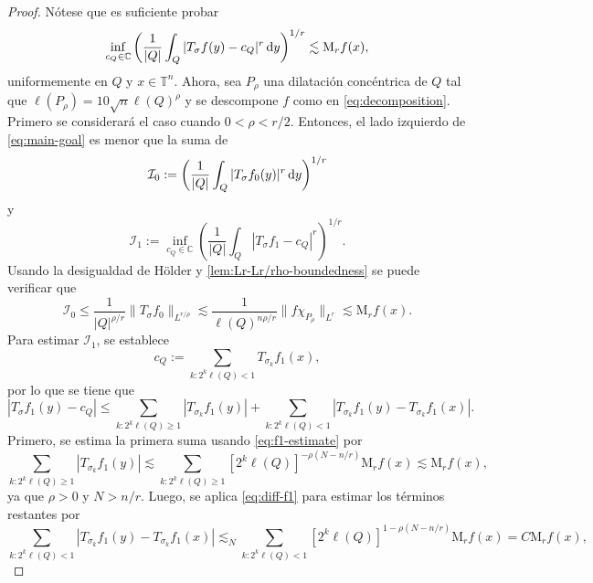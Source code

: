 \begin{proof}
Nótese que es suficiente probar 
\begin{equation}
	\inf_{c_Q\in \mathbb{C}} \left( 
	\frac{1}{|Q|} \int_Q|T_\sigma f(y) - c_Q|^r\mathop{}\!\mathrm{d} y
	\right)^{1/r} \lesssim \mathrm{M}_rf(x) ,
	\label{eq:main-goal}
\end{equation}
uniformemente en $Q$ y $x\in \mathbb{T}^n$. Ahora, sea $P_\rho$ una dilatación concéntrica de $Q$ tal que $\ell(P_\rho) = 10\sqrt{n}\ell(Q)^\rho$ y se descompone $f$ como en \cref{eq:decomposition}. Primero se considerará el caso cuando $0<\rho < r/2$. Entonces, el lado izquierdo de \cref{eq:main-goal} es menor que la suma de 
\begin{equation*}
	\mathcal{I}_0 := \left( 
	\frac{1}{|Q|} \int_Q|T_\sigma f_0(y)|^r\mathop{}\!\mathrm{d} y
	\right)^{1/r}
\end{equation*}
y 
\begin{equation*}
	\mathcal{I}_1 := \inf_{c_Q \in \mathbb{C}} \left(  \frac{1}{|Q|}\int_Q|T_\sigma f_1 - c_Q|^r
	\right)^{1/r}.
\end{equation*}
Usando la desigualdad de H\"older y \cref{lem:Lr-Lr/rho-boundedness} se puede verificar que 
\begin{equation*}
	\mathcal{I}_0 \leq \frac{1}{|Q|^{\rho/r}} \|T_\sigma f_0\|_{L^{r/\rho}} \lesssim\frac{1}{\ell(Q)^{n\rho/r}} \|f\chi_{P_\rho}\|_{L^r} \lesssim\mathrm{M}_rf(x). 
\end{equation*}
Para estimar $\mathcal{I}_1$, se establece 
\begin{equation}
	c_Q := \sum_{k:2^k\ell(Q)<1} T_{\sigma_k} f_1(x), 
	\label{eq:cQ}
\end{equation}
por lo que se tiene que
\begin{equation*}
	|T_\sigma f_1(y) - c_Q| \leq \sum_{k:2^k\ell(Q) \geq 1} |T_{\sigma_k}f_1(y)| + \sum_{k:2^k\ell(Q)<1}|T_{\sigma_k} f_1(y) - T_{\sigma_k} f_1(x)|  .
\end{equation*}
Primero, se estima la primera suma usando \cref{eq:f1-estimate} por
\begin{equation*}
	\sum_{k:2^k\ell(Q) \geq 1} |T_{\sigma_k}f_1(y)| \lesssim \sum_{k:2^k\ell(Q) \geq 1} [2^k\ell(Q)]^{-\rho(N-n/r)} \mathrm{M}_rf(x) \lesssim \mathrm{M}_rf(x),
\end{equation*}
ya que $\rho > 0$ y $N > n/r$. Luego, se aplica \cref{eq:diff-f1} para estimar los términos restantes por 
\begin{equation*}
	\sum_{k:2^k\ell(Q)<1}|T_{\sigma_k} f_1(y) - T_{\sigma_k} f_1(x)| \lesssim_N\sum_{k:2^k\ell(Q)<1} [2^k\ell(Q)]^{1-\rho(N-n/r)}\mathrm{M}_r f(x) = C\mathrm{M}_rf(x),

\end{equation*}
\end{proof}
